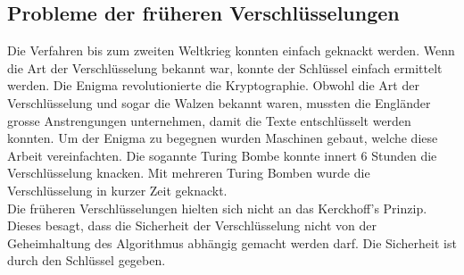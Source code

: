 \subsection{Probleme der früheren Verschlüsselungen}
Die Verfahren bis zum zweiten Weltkrieg konnten einfach geknackt werden. Wenn die Art der Verschlüsselung bekannt war, konnte der Schlüssel einfach ermittelt werden. 
Die Enigma revolutionierte die Kryptographie. Obwohl die Art der Verschlüsselung und sogar die Walzen bekannt waren, mussten die Engländer grosse Anstrengungen unternehmen, damit die Texte entschlüsselt werden konnten. Um der Enigma zu begegnen wurden Maschinen gebaut, welche diese Arbeit vereinfachten. Die sogannte Turing Bombe konnte innert 6 Stunden die Verschlüsselung knacken. 
Mit mehreren Turing Bomben wurde die Verschlüsselung in kurzer Zeit geknackt. \\[2ex]
%
Die früheren Verschlüsselungen hielten sich nicht an das Kerckhoff's Prinzip. Dieses besagt, dass die Sicherheit der Verschlüsselung nicht von der Geheimhaltung des Algorithmus abhängig gemacht werden darf. Die Sicherheit ist durch den Schlüssel gegeben. \cite{kerckhoffsprinzip}
%
